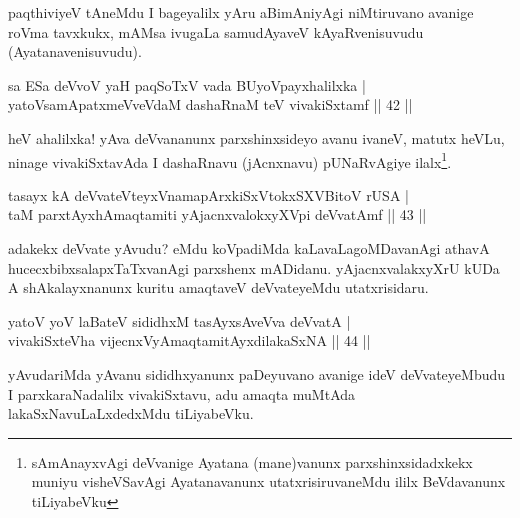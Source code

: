 \begin{artha}
paqthiviyeV tAneMdu I bageyalilx yAru aBimAniyAgi niMtiruvano avanige roVma tavxkukx, mAMsa ivugaLa samudAyaveV kAyaRvenisuvudu (Ayatanavenisuvudu).
\end{artha}


\begin{shl}
sa ESa deVvoV yaH paqSoTxV vada BUyoV\s payxhalilxka |\\
yatoV\s samApatxmeVveVdaM dashaRnaM teV vivakiSxtamf \hfill || 42 ||
\end{shl}

\begin{artha}
heV ahalilxka! yAva deVvananunx parxshinxsideyo avanu ivaneV, matutx heVLu, ninage vivakiSxtavAda I dashaRnavu (jAcnxnavu) pUNaRvAgiye ilalx\footnote{sAmAnayxvAgi deVvanige Ayatana (mane)vanunx parxshinxsidadxkekx muniyu visheVSavAgi Ayatanavanunx utatxrisiruvaneMdu ililx BeVdavanunx tiLiyabeVku}.
\end{artha}


\begin{shl}
tasayx kA deVvateVteyxVnamapArxkiSxVtokxSXVBitoV rUSA |\\
taM parxtAyxhAmaqtamiti yAjacnxvalokxyXV\s pi deVvatAmf \hfill || 43 ||
\end{shl}

\begin{artha}%
adakekx deVvate yAvudu? eMdu koVpadiMda kaLavaLagoMDavanAgi athavA hucecxbibxsalapxTaTxvanAgi parxshenx mADidanu. yAjacnxvalakxyXrU kUDa A shAkalayxnanunx kuritu amaqtaveV deVvateyeMdu utatxrisidaru.
\end{artha}


\begin{shl}
yatoV yoV laBateV sididhxM tasAyxsAveVva deVvatA |\\
vivakiSxteVha vijecnxVyA\s maqtamitAyxdilakaSxNA \hfill || 44 ||
\end{shl}

\begin{artha}
yAvudariMda yAvanu sididhxyanunx paDeyuvano avanige ideV deVvateyeMbudu I parxkaraNadalilx vivakiSxtavu, adu amaqta muMtAda lakaSxNavuLaLxdedxMdu tiLiyabeVku.
\end{artha}


